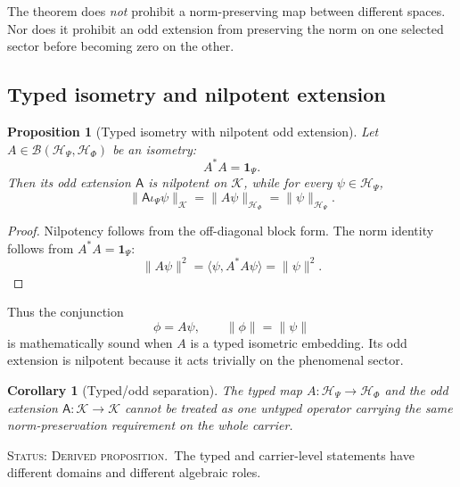 \documentclass[11pt,reqno]{scrartcl}
\newcommand{\scrK}{\mathscr K}
\newcommand{\scrHP}{\mathscr H_{\Psi}}
\newcommand{\scrHF}{\mathscr H_{\Phi}}
\newcommand{\idop}{\mathbf 1}
\newcommand{\Aodd}{\mathsf A}
\newcommand{\iP}{\iota_{\Psi}}
\newcommand{\inner}[2]{\langle #1,#2\rangle}
\newcommand{\statuslabel}[1]{\par\smallskip\noindent\textsc{Status: #1.}\ }
\theoremstyle{plain}
\newtheorem{proposition}[proposition]{Proposition}
\newtheorem{corollary}[corollary]{Corollary}
\theoremstyle{definition}
\theoremstyle{remark}
\begin{document}
The theorem does \emph{not} prohibit a norm-preserving map between different
spaces.  Nor does it prohibit an odd extension from preserving the norm on
one selected sector before becoming zero on the other.

\subsection{Typed isometry and nilpotent extension}

\begin{proposition}[Typed isometry with nilpotent odd extension]
\label{prop:typed-isometry}
Let \(A\in\mathcal B(\scrHP,\scrHF)\) be an isometry:
\begin{equation}
  A^*A=\idop_{\Psi}.
  \label{eq:A-isometry}
\end{equation}
Then its odd extension \(\Aodd\) is nilpotent on \(\scrK\), while for every
\(\psi\in\scrHP\),
\begin{equation}
  \|\Aodd\iP\psi\|_{\scrK}
  =\|A\psi\|_{\scrHF}
  =\|\psi\|_{\scrHP}.
  \label{eq:sector-isometry}
\end{equation}
\end{proposition}

\begin{proof}
Nilpotency follows from the off-diagonal block form.  The norm identity follows
from \(A^*A=\idop_{\Psi}\):
\begin{equation}
  \|A\psi\|^2
  =\inner{\psi}{A^*A\psi}
  =\|\psi\|^2.
\end{equation}
\end{proof}

Thus the conjunction
\begin{equation}
  \phi=A\psi,
  \qquad
  \|\phi\|=\|\psi\|
  \label{eq:original-conjunction}
\end{equation}
is mathematically sound when \(A\) is a typed isometric embedding.  Its odd
extension is nilpotent because it acts trivially on the phenomenal sector.

\begin{corollary}[Typed/odd separation]
\label{cor:typed-odd-separation}
The typed map \(A:\scrHP\to\scrHF\) and the odd extension
\(\Aodd:\scrK\to\scrK\) cannot be treated as one untyped operator carrying
the same norm-preservation requirement on the whole carrier.
\end{corollary}

\statuslabel{Derived proposition}The typed and carrier-level statements have
different domains and different algebraic roles.
\end{document}
